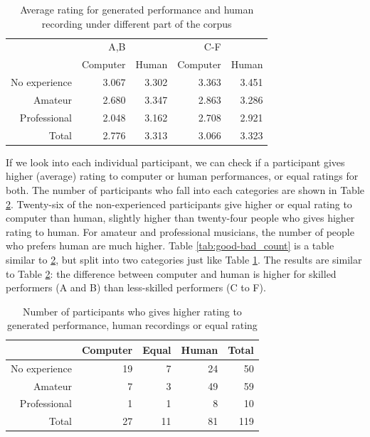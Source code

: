 \begin{table}
   \centering
   \caption{Average rating for generated performance and human recording under different part of the corpus}
   \label{tab:good-bad_rating}
   \begin{tabular}{r|rr|rr}
\hline
&A,B&&C-F&\\
&Computer &Human &Computer &Human \\
\hline
No experience&3.067&3.302&3.363&3.451\\
Amateur&2.680&3.347&2.863&3.286\\
Professional&2.048&3.162&2.708&2.921\\
\hline
Total&2.776&3.313&3.066&3.323\\
\hline
   \end{tabular}
\end{table}

If we look into each individual participant, we can check if a participant gives higher (average) rating to computer or human performances, or equal ratings for both. The number of participants who fall into each categories are shown in Table \ref{tab:avg_count}. Twenty-six of the non-experienced participants give higher or equal rating to computer than human, slightly higher than twenty-four people who gives higher rating to human. For amateur and professional musicians, the number of people who prefers human are much higher. Table \ref{tab:good-bad_count} is a table similar to \ref{tab:avg_count}, but split into two categories just like Table \ref{tab:good-bad_rating}. The results are similar to Table \ref{tab:avg_count}: the difference between computer and human is higher for skilled performers (A and B) than less-skilled performers (C to F).


\begin{table}
   \centering
   \caption{Number of participants who gives higher rating to generated performance, human recordings or equal rating}
   \label{tab:avg_count}
   \begin{tabular}{r|rrr|r}
      \hline
      &Computer&Equal&Human&Total\\
      \hline
      No experience&19&7&24&50\\
      Amateur&7&3&49&59\\
      Professional&1&1&8&10\\
      \hline
      Total&27&11&81&119\\
      \hline
   \end{tabular}
\end{table}

